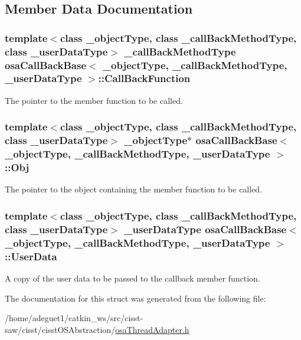 \subsection{Member Data Documentation}
\hypertarget{structosa_call_back_base_abfc6585f7501daad7cee19ab0b8a10eb}{
\subsubsection[{Call\-Back\-Function}]{\setlength{\rightskip}{0pt plus 5cm}template$<$class \-\_\-object\-Type, class \-\_\-call\-Back\-Method\-Type, class \-\_\-user\-Data\-Type$>$ \-\_\-call\-Back\-Method\-Type {\bf osa\-Call\-Back\-Base}$<$ \-\_\-object\-Type, \-\_\-call\-Back\-Method\-Type, \-\_\-user\-Data\-Type $>$\-::Call\-Back\-Function}}\label{structosa_call_back_base_abfc6585f7501daad7cee19ab0b8a10eb}
The pointer to the member function to be called. \hypertarget{structosa_call_back_base_a3ff953518bf08a840f22a4ff7e5b7c28}{
\subsubsection[{Obj}]{\setlength{\rightskip}{0pt plus 5cm}template$<$class \-\_\-object\-Type, class \-\_\-call\-Back\-Method\-Type, class \-\_\-user\-Data\-Type$>$ \-\_\-object\-Type$\ast$ {\bf osa\-Call\-Back\-Base}$<$ \-\_\-object\-Type, \-\_\-call\-Back\-Method\-Type, \-\_\-user\-Data\-Type $>$\-::Obj}}\label{structosa_call_back_base_a3ff953518bf08a840f22a4ff7e5b7c28}
The pointer to the object containing the member function to be called. \hypertarget{structosa_call_back_base_a1178c4cd366dc6de8a939accf7099974}{
\subsubsection[{User\-Data}]{\setlength{\rightskip}{0pt plus 5cm}template$<$class \-\_\-object\-Type, class \-\_\-call\-Back\-Method\-Type, class \-\_\-user\-Data\-Type$>$ \-\_\-user\-Data\-Type {\bf osa\-Call\-Back\-Base}$<$ \-\_\-object\-Type, \-\_\-call\-Back\-Method\-Type, \-\_\-user\-Data\-Type $>$\-::User\-Data}}\label{structosa_call_back_base_a1178c4cd366dc6de8a939accf7099974}
A copy of the user data to be passed to the callback member function. 

The documentation for this struct was generated from the following file\-:\begin{DoxyCompactItemize}
\item 
/home/adeguet1/catkin\-\_\-ws/src/cisst-\/saw/cisst/cisst\-O\-S\-Abstraction/\hyperlink{osa_thread_adapter_8h}{osa\-Thread\-Adapter.\-h}\end{DoxyCompactItemize}
